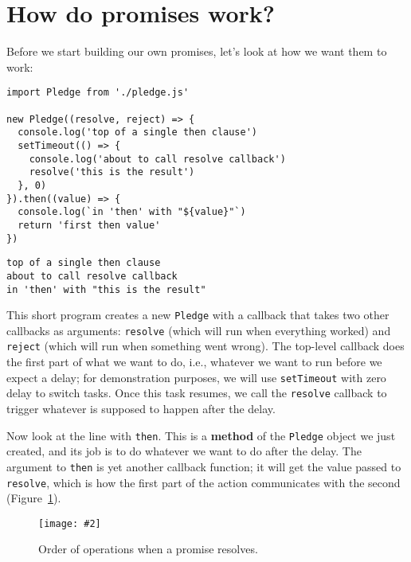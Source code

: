 \documentclass[krantzl]{krantz}
\newcommand{\figpdf}[4]{\begin{figure}%
\centering%
\texttt{[image: \#2]}%
\caption{#3}%
\label{#1}%
\end{figure}}
\newcommand{\figref}[1]{Figure~\ref{#1}}
\newcommand{\glossref}[1]{\textbf{#1}}
\begin{document}
\section{How do promises work?}\label{async-programming-promises}


Before we start building our own promises,
let's look at how we want them to work:


\begin{lstlisting}[frame=single,frameround=tttt]
import Pledge from './pledge.js'

new Pledge((resolve, reject) => {
  console.log('top of a single then clause')
  setTimeout(() => {
    console.log('about to call resolve callback')
    resolve('this is the result')
  }, 0)
}).then((value) => {
  console.log(`in 'then' with "${value}"`)
  return 'first then value'
})
\end{lstlisting}



\begin{lstlisting}[frame=single,frameround=tttt]
top of a single then clause
about to call resolve callback
in 'then' with "this is the result"
\end{lstlisting}



This short program creates a new \texttt{Pledge}
with a callback that takes two other callbacks as arguments:
\texttt{resolve} (which will run when everything worked)
and \texttt{reject} (which will run when something went wrong).
The top-level callback does the first part of what we want to do,
i.e.,
whatever we want to run before we expect a delay;
for demonstration purposes, we will use \texttt{setTimeout} with zero delay to switch tasks.
Once this task resumes,
we call the \texttt{resolve} callback to trigger whatever is supposed to happen after the delay.


Now look at the line with \texttt{then}.
This is a \glossref{method} of the \texttt{Pledge} object we just created,
and its job is to do whatever we want to do after the delay.
The argument to \texttt{then} is yet another callback function;
it will get the value passed to \texttt{resolve},
which is how the first part of the action communicates with the second
(\figref{async-programming-resolve}).

\figpdf{async-programming-resolve}{./async-programming/resolve.pdf}{Order of operations when a promise resolves.}{0.6}
\end{document}
